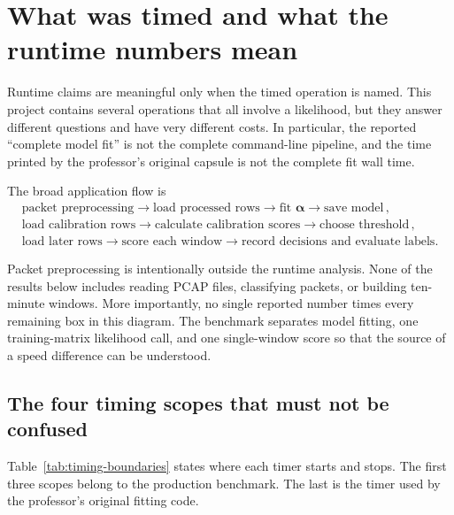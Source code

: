 \documentclass[11pt]{article}
\begin{document}
\section{What was timed and what the runtime numbers mean}

Runtime claims are meaningful only when the timed operation is named. This
project contains several operations that all involve a likelihood, but they
answer different questions and have very different costs. In particular, the
reported ``complete model fit'' is not the complete command-line pipeline, and
the time printed by the professor's original capsule is not the complete fit
wall time.

The broad application flow is
\[
\boxed{
\begin{gathered}
\text{packet preprocessing}
\longrightarrow \text{load processed rows}
\longrightarrow \text{fit }\boldsymbol{\alpha}
\longrightarrow \text{save model}\,,\\
\text{load calibration rows}
\longrightarrow \text{calculate calibration scores}
\longrightarrow \text{choose threshold}\,,\\
\text{load later rows}
\longrightarrow \text{score each window}
\longrightarrow \text{record decisions and evaluate labels}.
\end{gathered}}
\]

Packet preprocessing is intentionally outside the runtime analysis. None of
the results below includes reading PCAP files, classifying packets, or building
ten-minute windows. More importantly, no single reported number times every
remaining box in this diagram. The benchmark separates model fitting, one
training-matrix likelihood call, and one single-window score so that the source
of a speed difference can be understood.

\subsection{The four timing scopes that must not be confused}

Table~\ref{tab:timing-boundaries} states where each timer starts and stops.
The first three scopes belong to the production benchmark. The last is the
timer used by the professor's original fitting code.
\end{document}
